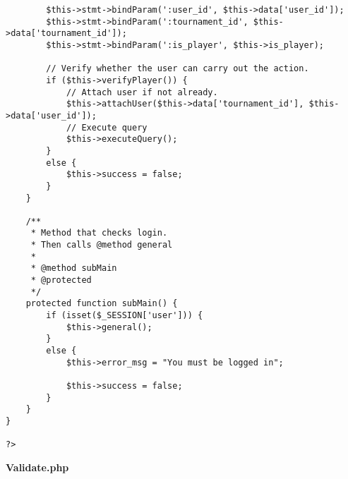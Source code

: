 {\begin{lstlisting}
		$this->stmt->bindParam(':user_id', $this->data['user_id']);
		$this->stmt->bindParam(':tournament_id', $this->data['tournament_id']);
		$this->stmt->bindParam(':is_player', $this->is_player);

		// Verify whether the user can carry out the action.
		if ($this->verifyPlayer()) {
			// Attach user if not already.
			$this->attachUser($this->data['tournament_id'], $this->data['user_id']);
			// Execute query
			$this->executeQuery();
		}
		else {
			$this->success = false;
		}
	}

	/**
	 * Method that checks login.
	 * Then calls @method general
	 *
	 * @method subMain
	 * @protected
	 */
	protected function subMain() {
		if (isset($_SESSION['user'])) {
			$this->general();
		}
		else {
			$this->error_msg = "You must be logged in";

			$this->success = false;
		}
	}
}

?>\end{lstlisting}
}
\textbf{Validate.php}

